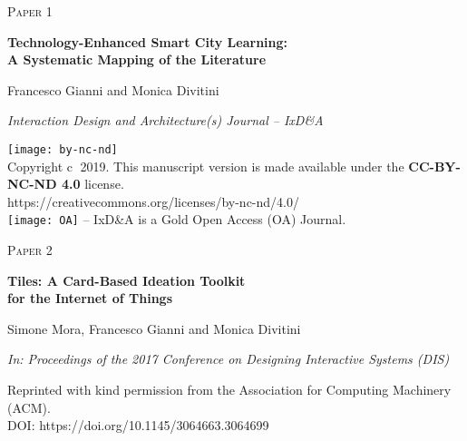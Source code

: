 \cleardoublepage
\begin{flushright}
\textsc{\huge Paper 1}
\end{flushright}
\vspace{3cm}
\begin{center}
	\begin{framed}
		{\Large \textbf{Technology-Enhanced Smart City Learning:\\ A Systematic Mapping of the Literature}}
		
		\medskip
		Francesco Gianni and Monica Divitini
		
		\medskip		
		\emph{Interaction Design and Architecture(s) Journal -- IxD\&A}
	\end{framed}	
\end{center}

\vspace{9cm}

\texttt{[image: by-nc-nd]}\\
{\scriptsize Copyright \textcircled{c} 2019. This manuscript version is made available under the \textbf{CC-BY-NC-ND 4.0} license.}\\
{\tiny https://creativecommons.org/licenses/by-nc-nd/4.0/}\\
\texttt{[image: OA]} {\scriptsize -- IxD\&A is a Gold Open Access (OA) Journal.}
\cleardoublepage


\cleardoublepage
\begin{flushright}
\textsc{\huge Paper 2}
\end{flushright}
\vspace{3cm}
\begin{center}
	\begin{framed}
		{\Large \textbf{Tiles: A Card-Based Ideation Toolkit\\ for the Internet of Things}}
		
		\medskip
		Simone Mora, Francesco Gianni and Monica Divitini
		
		\medskip		
		\emph{In: Proceedings of the 2017 Conference on Designing Interactive Systems (DIS)}
	\end{framed}
\end{center}

\vspace{10cm}

{\scriptsize Reprinted with kind permission from the Association for Computing Machinery (ACM).}\\
{\tiny DOI: https://doi.org/10.1145/3064663.3064699}
\cleardoublepage


